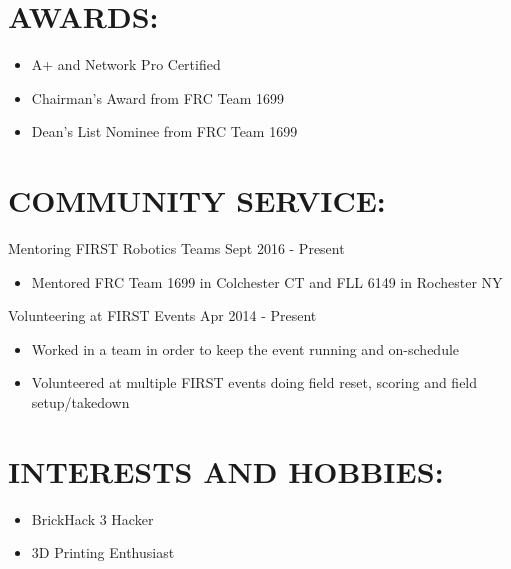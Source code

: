 \documentclass[line,margin]{res}
\begin{document}
\begin{resume}
\section{AWARDS:}
	\begin{itemize}
		\setlength{\itemindent}{-15pt}
		\item A+ and Network Pro Certified
		\item Chairman's Award from FRC Team 1699
		\item Dean's List Nominee from FRC Team 1699
	\end{itemize}		

\section{COMMUNITY SERVICE:}  

	Mentoring FIRST Robotics Teams \hfill Sept 2016 - Present
	\begin{itemize}
		\item Mentored FRC Team 1699 in Colchester CT and FLL 6149 in Rochester NY
	\end{itemize}

	Volunteering at FIRST Events \hfill Apr 2014 - Present
	\begin{itemize}
		\item Worked in a team in order to keep the event running and on-schedule
		\item Volunteered at multiple FIRST events doing field reset, scoring and field setup/takedown
	\end{itemize}

\section{INTERESTS AND HOBBIES:}
	\begin{itemize}
		\item BrickHack 3 Hacker
		\item 3D Printing Enthusiast 
	\end{itemize}

\end{resume}
\end{document}
